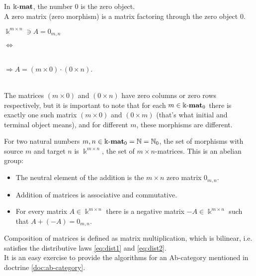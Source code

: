 \begin{example}\label{ex:kmat_pre-additive}
In $\Bbbk\textnormal{-}\mathbf{mat}$, the number $0$ is the zero object.\\
A zero matrix (zero morphism) is a matrix factoring through the zero object $0$.\\
\begin{minipage}{.2\textwidth}\phantom{ }\end{minipage}
\begin{minipage}{.25\textwidth}
$\Bbbk^{m\times n} \ni A = 0_{m,n}$
\end{minipage}
\begin{minipage}{.08\textwidth}
$\Longleftrightarrow$
\end{minipage}
\begin{minipage}{.32\textwidth}
\\
$\Rightarrow A = (m \times 0) \cdot (0 \times n)$.
\end{minipage}
\begin{minipage}{.15\textwidth}\phantom{ }\end{minipage}\\

\noindent The matrices $(m \times 0)$ and $(0 \times n)$ have zero columns or zero rows respectively, but it is
important to note that for each $m \in \Bbbk\textnormal{-}\mathbf{mat}_{0}$ there is exactly one such matrix $(m \times 0)$ and $(0 \times m)$
(that's what initial and terminal object means), and for different $m$, these morphisms are different.

For two natural numbers $m,n \in {\Bbbk\textnormal{-}\mathbf{mat}}_{0} = \mathbb{N} = \mathbb{N}_{0}$, the set of morphisms with source $m$ and target $n$ is
$\Bbbk^{m\times n}$, the set of $m \times n$-matrices. This is an abelian group:
\begin{itemize}
\item The neutral element of the addition is the $m \times n$ zero matrix $0_{m,n}$.
\item Addition of matrices is associative and commutative.
\item For every matrix $A \in \Bbbk^{m\times n}$ there is a negative matrix $-A \in \Bbbk^{m \times n}$ such that $A + (-A) = 0_{m,n}$.
\end{itemize}
Composition of matrices is defined as matrix multiplication, which is bilinear, i.e. satisfies the distributive laws \eqref{eq:dist1} and
\eqref{eq:dist2}.\\
It is an easy exercise to provide the algorithms for an Ab-category mentioned in doctrine \ref{doc:ab-category}.
\end{example}

